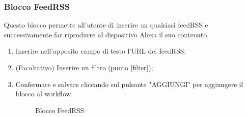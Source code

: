 \subsubsection{Blocco FeedRSS}
Questo blocco permette all'utente di inserire un qualsiasi feedRSS e successivamente far riprodurre al dispositivo Alexa il suo contenuto.
\begin{enumerate}
	\item Inserire nell'apposito campo di testo l'URL del feedRSS;
	\item (Facoltativo) Inserire un filtro (punto \ref{filter});
	\newpage
	\item Confermare e salvare cliccando sul pulsante "AGGIUNGI" per aggiungere il blocco al workflow.
	\begin{figure}[!ht]
		\centering
		\caption{Blocco FeedRSS}
	\end{figure}
\end{enumerate}

